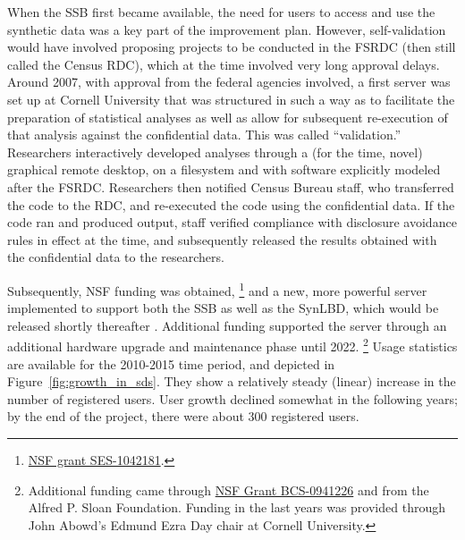 \documentclass[12pt]{article}
\begin{document}

When the \ac{SSB} first became available, the need for users to access and use the synthetic data was a key part of the improvement plan. However, self-validation would have involved proposing projects to be conducted in the \ac{FSRDC} (then still called the Census RDC), which at the time involved very long approval delays.  Around 2007, with approval from the federal agencies involved, a first server was set up at Cornell University that was structured in such a way as to facilitate the preparation of statistical analyses as well as allow for subsequent re-execution of that analysis against the confidential data. This was called ``validation.'' Researchers interactively developed analyses through a (for the time, novel) graphical remote desktop, on a filesystem and with software explicitly modeled after the \ac{FSRDC}. Researchers then notified Census Bureau staff, who transferred the code to the RDC, and re-executed the code using the confidential data. If the code ran and produced output, staff verified compliance with disclosure avoidance rules in effect at the time, and subsequently released the results obtained with the confidential data to the researchers.

%
Subsequently, \ac{NSF} funding was obtained,%
%
\footnote{\href{https://www.nsf.gov/awardsearch/showAward?AWD_ID=1042181}{NSF grant SES-1042181}.}
%
and a new, more powerful server implemented to support both the \ac{SSB} as well as the \ac{SynLBD}, which would be released shortly thereafter \citep{KinneyEtAl2011}. Additional funding supported the server through an additional hardware upgrade and maintenance phase until 2022.%
%
\footnote{ Additional funding came through \href{https://www.nsf.gov/awardsearch/showAward?AWD_ID=0941226}{NSF Grant BCS-0941226} and from the Alfred P. Sloan Foundation. Funding in the last years was provided through John Abowd's Edmund Ezra Day chair at Cornell University.}
%
Usage statistics are available for the 2010-2015 time period, and depicted in Figure~\ref{fig:growth_in_sds}. They show a relatively steady (linear) increase in the number of registered users. User growth declined somewhat in the following years; by the end of the project, there were about 300 registered users.
\end{document}
